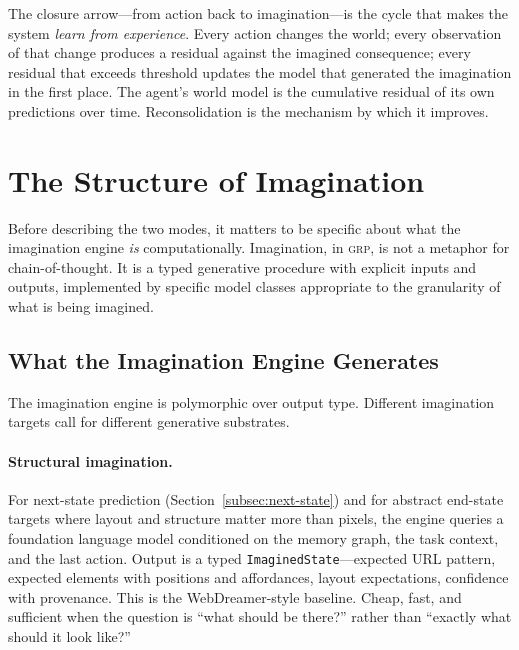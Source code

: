 \documentclass[12pt]{article}
\theoremstyle{definition}
\theoremstyle{remark}
\newcommand{\grp}{\textsc{grp}}
\begin{document}
The closure arrow---from action back to imagination---is the cycle
that makes the system \emph{learn from experience}. Every action
changes the world; every observation of that change produces a
residual against the imagined consequence; every residual that
exceeds threshold updates the model that generated the imagination
in the first place. The agent's world model is the cumulative
residual of its own predictions over time. Reconsolidation is the
mechanism by which it improves.

\section{The Structure of Imagination}
\label{sec:two-modes}

Before describing the two modes, it matters to be specific about what
the imagination engine \emph{is} computationally. Imagination, in
\grp{}, is not a metaphor for chain-of-thought. It is a typed
generative procedure with explicit inputs and outputs, implemented by
specific model classes appropriate to the granularity of what is being
imagined.

\subsection{What the Imagination Engine Generates}
\label{subsec:structure-of-imagination}

The imagination engine is polymorphic over output type. Different
imagination targets call for different generative substrates.

\paragraph{Structural imagination.}
For next-state prediction (Section~\ref{subsec:next-state}) and for
abstract end-state targets where layout and structure matter more than
pixels, the engine queries a foundation language model conditioned on
the memory graph, the task context, and the last action. Output is a
typed \texttt{ImaginedState}---expected URL pattern, expected elements
with positions and affordances, layout expectations, confidence with
provenance. This is the WebDreamer-style baseline. Cheap, fast, and
sufficient when the question is ``what should be there?'' rather than
``exactly what should it look like?''
\end{document}

